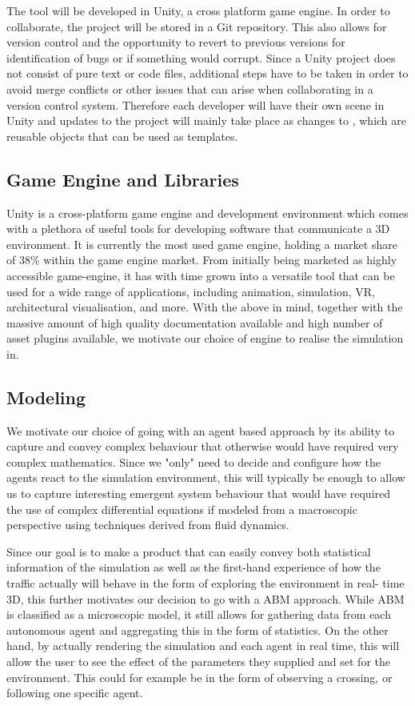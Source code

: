 The tool will be developed in Unity, a cross platform game engine. In order to collaborate, the project will be stored in a Git repository. This also allows for version control and the opportunity to revert to previous versions for identification of bugs or if something would corrupt. Since a Unity project does not consist of pure text or code files, additional steps have to be taken in order to avoid merge conflicts or other issues that can arise when collaborating in a version control system. Therefore each developer will have their own scene in Unity and updates to the project will mainly take place as changes to , which are reusable objects that can be used as templates.

\subsection{Game Engine and Libraries}
    Unity is a cross-platform game engine and development environment which comes with a plethora of useful tools for developing software that communicate a 3D environment. It is currently the most used game engine, holding a market share of 38\% within the game engine market. From initially being marketed as highly accessible game-engine, it has with time grown into a versatile tool that can be used for a wide range of applications, including animation, simulation, VR, architectural visualisation, and more. With the above in mind, together with the massive amount of high quality documentation available and high number of asset plugins available, we motivate our choice of engine to realise the simulation in. 

\subsection{Modeling}
    We motivate our choice of going with an agent based approach by its ability to capture and convey complex behaviour that otherwise would have required very complex mathematics. Since we "only" need to decide and configure how the agents react to the simulation environment, this will typically be enough to allow us to capture interesting emergent system behaviour that would have required the use of complex differential equations if modeled from a macroscopic perspective using techniques derived from fluid dynamics. 

    Since our goal is to make a product that can easily convey both statistical information of the simulation as well as the first-hand experience of how the traffic actually will behave in the form of exploring the environment in real- time 3D, this further motivates our decision to go with a ABM approach. While ABM is classified as a microscopic model, it still allows for gathering data from each autonomous agent and aggregating this in the form of statistics. On the other hand, by actually rendering the simulation and each agent in real time, this will allow the user to see the effect of the parameters they supplied and set for the environment. This could for example be in the form of observing a crossing, or following one specific agent. 

